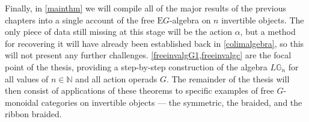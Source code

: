 Finally, in \cref{mainthm} we will compile all of the major results of the previous chapters into a single account of the free $\mathrm{E}G$-algebra on $n$ invertible objects. The only piece of data still missing at this stage will be the action $\alpha$, but a method for recovering it will have already been established back in \cref{colimalgebra}, so this will not present any further challenges. \cref{freeinvalgG1,freeinvalgc} are the focal point of the thesis, providing a step-by-step construction of the algebra $L\mathbb{G}_n$ for all values of $n \in \mathbb{N}$ and all action operads $G$. The remainder of the thesis will then consist of applications of these theorems to specific examples of free $G$-monoidal categories on invertible objects --- the symmetric, the braided, and the ribbon braided.   





















